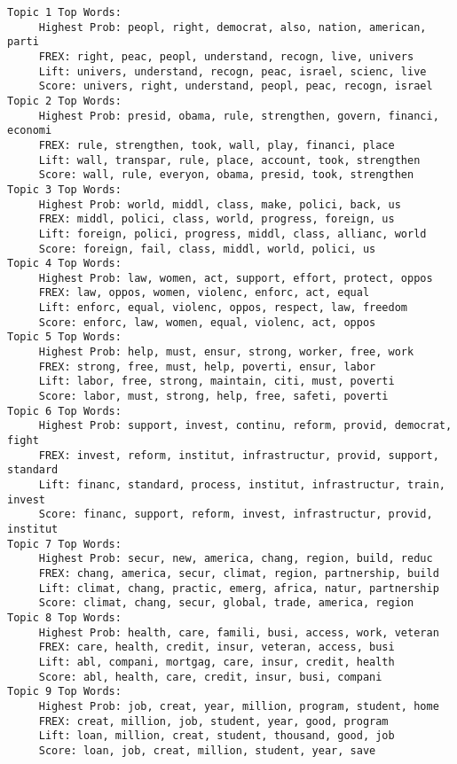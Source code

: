 \documentclass[
]{article}
\begin{document}
\begin{verbatim}
Topic 1 Top Words:
     Highest Prob: peopl, right, democrat, also, nation, american, parti 
     FREX: right, peac, peopl, understand, recogn, live, univers 
     Lift: univers, understand, recogn, peac, israel, scienc, live 
     Score: univers, right, understand, peopl, peac, recogn, israel 
Topic 2 Top Words:
     Highest Prob: presid, obama, rule, strengthen, govern, financi, economi 
     FREX: rule, strengthen, took, wall, play, financi, place 
     Lift: wall, transpar, rule, place, account, took, strengthen 
     Score: wall, rule, everyon, obama, presid, took, strengthen 
Topic 3 Top Words:
     Highest Prob: world, middl, class, make, polici, back, us 
     FREX: middl, polici, class, world, progress, foreign, us 
     Lift: foreign, polici, progress, middl, class, allianc, world 
     Score: foreign, fail, class, middl, world, polici, us 
Topic 4 Top Words:
     Highest Prob: law, women, act, support, effort, protect, oppos 
     FREX: law, oppos, women, violenc, enforc, act, equal 
     Lift: enforc, equal, violenc, oppos, respect, law, freedom 
     Score: enforc, law, women, equal, violenc, act, oppos 
Topic 5 Top Words:
     Highest Prob: help, must, ensur, strong, worker, free, work 
     FREX: strong, free, must, help, poverti, ensur, labor 
     Lift: labor, free, strong, maintain, citi, must, poverti 
     Score: labor, must, strong, help, free, safeti, poverti 
Topic 6 Top Words:
     Highest Prob: support, invest, continu, reform, provid, democrat, fight 
     FREX: invest, reform, institut, infrastructur, provid, support, standard 
     Lift: financ, standard, process, institut, infrastructur, train, invest 
     Score: financ, support, reform, invest, infrastructur, provid, institut 
Topic 7 Top Words:
     Highest Prob: secur, new, america, chang, region, build, reduc 
     FREX: chang, america, secur, climat, region, partnership, build 
     Lift: climat, chang, practic, emerg, africa, natur, partnership 
     Score: climat, chang, secur, global, trade, america, region 
Topic 8 Top Words:
     Highest Prob: health, care, famili, busi, access, work, veteran 
     FREX: care, health, credit, insur, veteran, access, busi 
     Lift: abl, compani, mortgag, care, insur, credit, health 
     Score: abl, health, care, credit, insur, busi, compani 
Topic 9 Top Words:
     Highest Prob: job, creat, year, million, program, student, home 
     FREX: creat, million, job, student, year, good, program 
     Lift: loan, million, creat, student, thousand, good, job 
     Score: loan, job, creat, million, student, year, save 

\end{verbatim}
\end{document}
